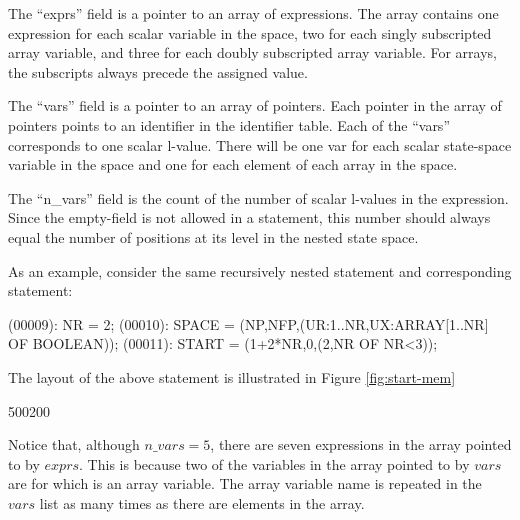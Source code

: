 The ``exprs'' field is a pointer to an array of expressions.   The array
contains one expression for each scalar variable in the space,
two for each singly subscripted array variable, and three for each doubly
subscripted array variable.   For arrays, the subscripts always precede
the assigned value.

The ``vars'' field is a pointer to an array of pointers.   Each pointer in
the array of pointers points to an identifier in the identifier table.
Each of the ``vars'' corresponds to one scalar l-value.    There will be
one var for each scalar state-space variable in the space and one for each
element of each array in the space.

The ``n\_vars'' field is the count of the number
of scalar l-values in the 
expression.  Since the empty-field is not
allowed in a  statement, this
number should always equal the number of positions at its level in the nested
state space.

As an example, consider the same recursively nested  statement and
corresponding  statement:
\begin{codeexample}
(00009): NR = 2;
(00010): SPACE = (NP,NFP,(UR:1..NR,UX:ARRAY[1..NR] OF BOOLEAN));
(00011): START = (1+2*NR,0,(2,NR OF NR<3));
\end{codeexample}
The layout of the above  statement is illustrated
in Figure \ref{fig:start-mem}

\startfig
\begin{fast_picture}{500}{200}
\savFboxpos
{}
      \nextBbox{}
      \nextBbox{}
      \nextBbox{}
      \nextBbox{}
      \nextBbox{}
      \nextBbox{}
      \nextBbox{}
\nextFbox{}
      \stackBbox
      \nextBbox\valbox{}
      \nextBbox\valbox{}
      \nextBbox\valbox{}
      \nextBbox\valbox{}
      \nextBbox\valbox{}
\nextFbox{}
\end{fast_picture}

Notice that, although $n\_vars=5$, there are seven expressions in the
array pointed to by $exprs$.   This is because two of the variables in the
array pointed to by $vars$ are for  which is an array
variable.   The array variable name  is repeated in the $vars$
list as many times as there are elements in the array.

